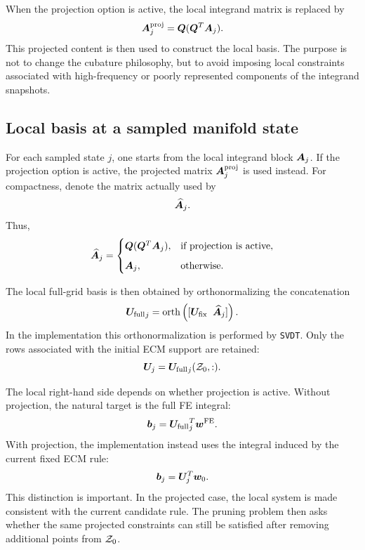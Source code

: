 \documentclass[11pt,a4paper]{article}
\begin{document}
When the projection option is active, the local integrand matrix is replaced by
\[
        \bm A_j^{\mathrm{proj}}
        =
        \bm Q(\bm Q^T\bm A_j).
\]
This projected content is then used to construct the local basis. The purpose
is not to change the cubature philosophy, but to avoid imposing local
constraints associated with high-frequency or poorly represented components of
the integrand snapshots.

\subsection{Local basis at a sampled manifold state}

For each sampled state $j$, one starts from the local integrand block
$\bm A_j$. If the projection option is active, the projected matrix
$\bm A_j^{\mathrm{proj}}$ is used instead. For compactness, denote the matrix
actually used by
\[
        \widehat{\bm A}_j.
\]
Thus,
\[
        \widehat{\bm A}_j =
        \begin{cases}
        \bm Q(\bm Q^T\bm A_j),
        & \text{if projection is active},\\[2mm]
        \bm A_j,
        & \text{otherwise}.
        \end{cases}
\]

The local full-grid basis is then obtained by orthonormalizing the
concatenation
\[
        {\bm U_{\mathrm{full}}}_j
        =
        \operatorname{orth}
        \left(
        [\bm U_{\mathrm{fix}}\;\;\widehat{\bm A}_j]
        \right).
\]
In the implementation this orthonormalization is performed by \texttt{SVDT}.
Only the rows associated with the initial ECM support are retained:
\[
        \bm U_j = {\bm U_{\mathrm{full}}}_j(\mathcal{Z}_{0},:).
\]

The local right-hand side depends on whether projection is active. Without
projection, the natural target is the full FE integral:
\[
        \bm b_j
        =
        {\bm U_{\mathrm{full}}}_j^T\bm w^{\mathrm{FE}}.
        \label{eq:b_full_fe}
\]
With projection, the implementation instead uses the integral induced by the
current fixed ECM rule:
\[
        \bm b_j
        =
        \bm U_j^T\bm w_{0}.
        \label{eq:b_projected_ecm}
\]
This distinction is important. In the projected case, the local system is made
consistent with the current candidate rule. The pruning problem then asks
whether the same projected constraints can still be satisfied after removing
additional points from $\mathcal{Z}_{0}$.
\end{document}
